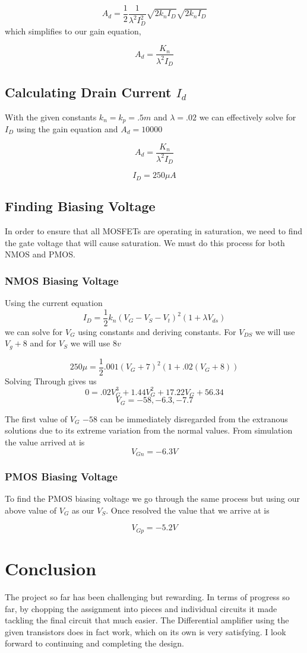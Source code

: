 \documentclass[12pt]{article}
\begin{document}
	
	$$A_d = \frac{1}{2} \frac{1}{\lambda^2 I_D^2} \sqrt{2 k_n I_D} \sqrt{2 k_n I_D}$$
	which simplifies to our gain equation,
	
	$$A_d  = \frac{K_n}{\lambda^2 I_D}$$
	
	\subsection{Calculating Drain Current $I_d$}
	With the given constants $k_n = k_p = .5m$ and $\lambda = .02$ we can effectively solve for $I_D$ using the gain equation and $A_d = 10000$
	
	$$A_d  = \frac{K_n}{\lambda^2 I_D}$$
	
	
	
	$$I_D = 250\mu A$$
	
	\subsection{Finding Biasing Voltage}
	In order to ensure that all MOSFETs are operating in saturation, we need to find the gate voltage that will cause saturation. We must do this process for both NMOS and PMOS.
	\subsubsection{NMOS Biasing Voltage} 
	Using the current equation 
	$$I_D = \frac{1}{2} k_n (V_G -V_S - V_t)^2 (1 + \lambda V_{ds})$$
	we can solve for $V_G$ using constants and deriving constants. For $V_{DS}$ we will use $V_g + 8$ and for $V_S$ we will use $8v$
	
	$$250 \mu = \frac{1}{2} .001 (V_G + 7)^2 (1+.02(V_G + 8))$$
	 Solving Through gives us 
	 $$0 = .02V_G^3 + 1.44V_G^2 + 17.22V_G + 56.34$$
	 $$V_G = -58, -6.3 , -7.7$$
	 
	 The first value of $V_G$ $-58$ can be immediately disregarded from the extranous solutions due to its extreme variation from the normal values. From simulation the value arrived at is $$V_{Gn} = -6.3V$$
	 
	\subsubsection{PMOS Biasing Voltage}
	
	To find the PMOS biasing voltage we go through the same process but using our above value of $V_G$ as our $V_S$. Once resolved the value that we arrive at is
	
	$$V_{Gp} = -5.2V$$
	
	
	\section{Conclusion}
	The project so far has been challenging but rewarding. In terms of progress so far, by chopping the assignment into pieces and individual circuits it made tackling the final circuit that much easier. The Differential amplifier using the given transistors does in fact work, which on its own is very satisfying. I look forward to continuing and completing the design.
	
	
	
	
	
\end{document}
